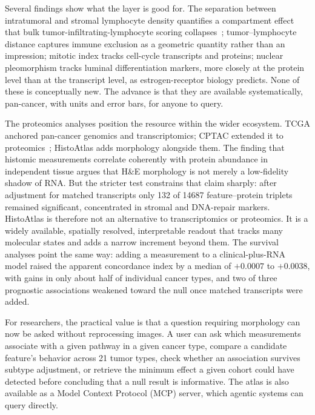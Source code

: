 Several findings show what the layer is good for. The separation between
intratumoral and stromal lymphocyte density quantifies a compartment effect that
bulk tumor-infiltrating-lymphocyte scoring collapses~\cite{saltz2018til,
galon2006}; tumor--lymphocyte distance captures immune exclusion as a
geometric quantity rather than an impression; mitotic index tracks cell-cycle
transcripts and proteins; nuclear pleomorphism tracks luminal differentiation
markers, more closely at the protein level than at the transcript level, as
estrogen-receptor biology predicts. None of these is conceptually new. The
advance is that they are available systematically, pan-cancer, with units and
error bars, for anyone to query.

The proteomics analyses position the resource within the wider ecosystem. TCGA
anchored pan-cancer genomics and transcriptomics; CPTAC extended it to
proteomics~\cite{li2023cptac}; HistoAtlas adds morphology alongside them. The
finding that histomic measurements correlate coherently with protein abundance in
independent tissue argues that H\&E morphology is not merely a low-fidelity
shadow of RNA. But the stricter test constrains that claim sharply: after
adjustment for matched transcripts only 132 of \num{14687} feature--protein
triplets remained significant, concentrated in stromal and DNA-repair markers.
HistoAtlas is therefore not an alternative to transcriptomics or proteomics. It
is a widely available, spatially resolved, interpretable readout that tracks
many molecular states and adds a narrow increment beyond them. The survival
analyses point the same way: adding a measurement to a clinical-plus-RNA model
raised the apparent concordance index by a median of $+0.0007$ to $+0.0038$, with
gains in only about half of individual cancer types, and two of three prognostic
associations weakened toward the null once matched transcripts were added.

For researchers, the practical value is that a question requiring morphology can
now be asked without reprocessing images. A user can ask which measurements
associate with a given pathway in a given cancer type, compare a candidate
feature's behavior across 21 tumor types, check whether an association survives
subtype adjustment, or retrieve the minimum effect a given cohort could have
detected before concluding that a null result is informative. The atlas is also
available as a Model Context Protocol (MCP) server, which agentic systems can
query directly.

